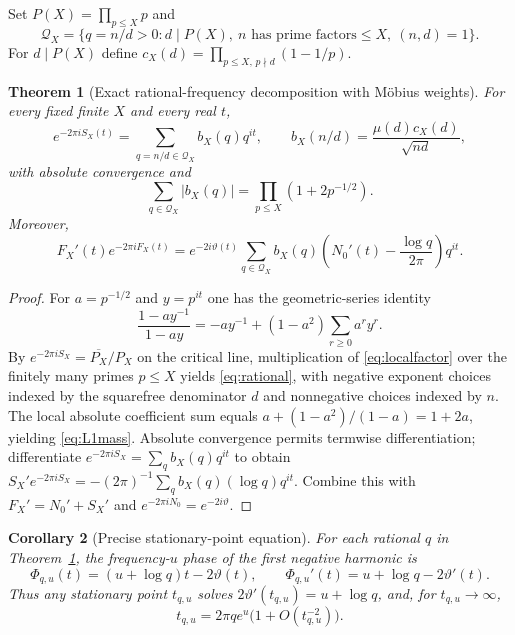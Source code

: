 \documentclass[11pt,a4paper]{article}
\numberwithin{equation}{section}
\newtheorem{theorem}{Theorem}[section]
\newtheorem{corollary}[theorem]{Corollary}
\begin{document}
Set $P(X)=\prod_{p\le X}p$ and
\begin{equation}\label{eq:coeffdef}
\mathscr Q_X=\{q=n/d>0: d\mid P(X),\ n\text{ has prime factors}\le X,\ (n,d)=1\}.
\end{equation}
For $d\mid P(X)$ define $c_X(d)=\prod_{p\le X,\,p\nmid d}(1-1/p)$.
\begin{theorem}[Exact rational-frequency decomposition with M\"obius weights]\label{thm:rational}
For every fixed finite $X$ and every real $t$,
\begin{equation}\label{eq:rational}
e^{-2\pi iS_X(t)}=\sum_{q=n/d\in\mathscr Q_X}
 b_X(q)q^{it},\qquad
b_X(n/d)=\frac{\mu(d)c_X(d)}{\sqrt{nd}},
\end{equation}
with absolute convergence and
\begin{equation}\label{eq:L1mass}
\sum_{q\in\mathscr Q_X}|b_X(q)|=\prod_{p\le X}(1+2p^{-1/2}).
\end{equation}
Moreover,
\begin{equation}\label{eq:rationalderiv}
F_X'(t)e^{-2\pi iF_X(t)}
=e^{-2i\vartheta(t)}\sum_{q\in\mathscr Q_X}
 b_X(q)\left(N_0'(t)-\frac{\log q}{2\pi}\right)q^{it}.
\end{equation}
\end{theorem}
\begin{proof}
For $a=p^{-1/2}$ and $y=p^{it}$ one has the geometric-series identity
\begin{equation}\label{eq:localfactor}
\frac{1-ay^{-1}}{1-ay}=-ay^{-1}+(1-a^2)\sum_{r\ge0}a^ry^r.
\end{equation}
By $e^{-2\pi iS_X}=\overline{P_X}/P_X$ on the critical line, multiplication of \eqref{eq:localfactor} over the finitely many primes $p\le X$ yields \eqref{eq:rational}, with negative exponent choices indexed by the squarefree denominator $d$ and nonnegative choices indexed by $n$. The local absolute coefficient sum equals $a+(1-a^2)/(1-a)=1+2a$, yielding \eqref{eq:L1mass}. Absolute convergence permits termwise differentiation; differentiate $e^{-2\pi iS_X}=\sum_q b_X(q)q^{it}$ to obtain
$S_X'e^{-2\pi iS_X}=-(2\pi)^{-1}\sum_q b_X(q)(\log q)q^{it}$.
Combine this with $F_X'=N_0'+S_X'$ and $e^{-2\pi iN_0}=e^{-2i\vartheta}$.
\end{proof}
\begin{corollary}[Precise stationary-point equation]\label{cor:stationary}
For each rational $q$ in Theorem~\ref{thm:rational}, the frequency-$u$ phase of the first negative harmonic is
\begin{equation}\label{eq:stphase}
\Phi_{q,u}(t)=(u+\log q)t-2\vartheta(t),\qquad
\Phi_{q,u}'(t)=u+\log q-2\vartheta'(t).
\end{equation}
Thus any stationary point $t_{q,u}$ solves $2\vartheta'(t_{q,u})=u+\log q$, and, for $t_{q,u}\to\infty$,
\begin{equation}\label{eq:stloc}
t_{q,u}=2\pi q e^u\bigl(1+O(t_{q,u}^{-2})\bigr).
\end{equation}
\end{corollary}
\end{document}
